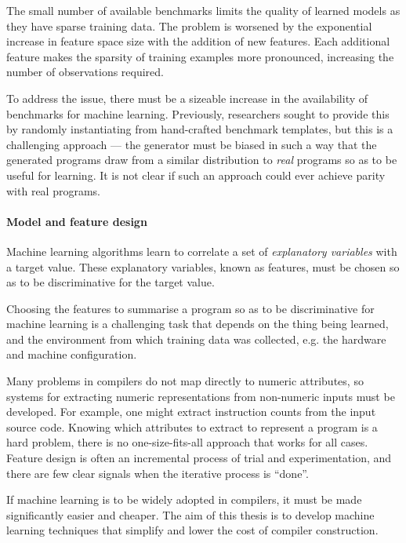 The small number of available benchmarks limits the quality of learned models as they have sparse training data. The problem is worsened by the exponential increase in feature space size with the addition of new features. Each additional feature makes the sparsity of training examples more pronounced, increasing the number of observations required.

To address the issue, there must be a sizeable increase in the availability of benchmarks for machine learning. Previously, researchers sought to provide this by randomly instantiating from hand-crafted benchmark templates, but this is a challenging approach --- the generator must be biased in such a way that the generated programs draw from a similar distribution to \emph{real} programs so as to be useful for learning. It is not clear if such an approach could ever achieve parity with real programs.

\paragraph*{Model and feature design} Machine learning algorithms learn to correlate a set of \emph{explanatory variables} with a target value. These explanatory variables, known as features, must be chosen so as to be discriminative for the target value.

Choosing the features to summarise a program so as to be discriminative for machine learning is a challenging task that depends on the thing being learned, and the environment from which training data was collected, e.g. the hardware and machine configuration.

Many problems in compilers do not map directly to numeric attributes, so systems for extracting numeric representations from non-numeric inputs must be developed. For example, one might extract instruction counts from the input source code. Knowing which attributes to extract to represent a program is a hard problem, there is no one-size-fits-all approach that works for all cases. Feature design is often an incremental process of trial and experimentation, and there are few clear signals when the iterative process is ``done''.

If machine learning is to be widely adopted in compilers, it must be made significantly easier and cheaper. The aim of this thesis is to develop machine learning techniques that simplify and lower the cost of compiler construction.




